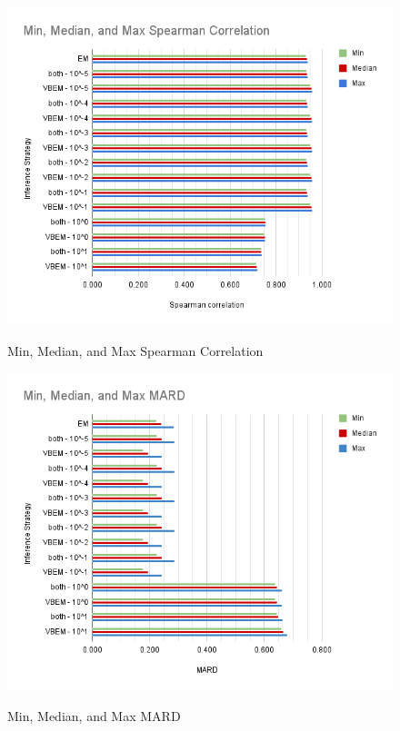 

% 
% 

\begin{figure}[!t]%
\centering
{\includegraphics[width=\textwidth]{Min, Median, and Max Spearman Correlation.png}}
\caption{Min, Median, and Max Spearman Correlation}\label{spearfig}
\end{figure}

\begin{figure}[!t]%
  \centering
  {\includegraphics[width=\textwidth]{Min, Median, and Max MARD.png}}
  \caption{Min, Median, and Max MARD}\label{mardfig}
  \end{figure}
